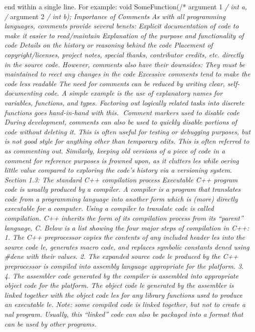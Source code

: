 end within a single line. For example: void SomeFunction(/* argument 1
\emph{/ int a, /} argument 2 \emph{/ int b); Importance of Comments As
with all programming languages, comments provide several benets:
Explicit documentation of code to make it easier to read/maintain
Explanation of the purpose and functionality of code Details on the
history or reasoning behind the code Placement of copyright/licenses,
project notes, special thanks, contributor credits, etc. directly in the
source code. However, comments also have their downsides: They must be
maintained to reect any changes in the code Excessive comments tend to
make the code less readable The need for comments can be reduced by
writing clear, self-documenting code. A simple example is the use of
explanatory names for variables, functions, and types. Factoring out
logically related tasks into discrete functions goes hand-in-hand with
this. Comment markers used to disable code During development, comments
can also be used to quickly disable portions of code without deleting
it. This is often useful for testing or debugging purposes, but is not
good style for anything other than temporary edits. This is often
referred to as commenting out. Similarly, keeping old versions of a
piece of code in a comment for reference purposes is frowned upon, as it
clutters les while oering little value compared to exploring the code's
history via a versioning system. Section 1.3: The standard C++
compilation process Executable C++ program code is usually produced by a
compiler. A compiler is a program that translates code from a
programming language into another form which is (more) directly
executable for a computer. Using a compiler to translate code is called
compilation. C++ inherits the form of its compilation process from its
``parent'' language, C. Below is a list showing the four major steps of
compilation in C++: 1. The C++ preprocessor copies the contents of any
included header les into the source code le, generates macro code, and
replaces symbolic constants dened using \#dene with their values. 2. The
expanded source code le produced by the C++ preprocessor is compiled
into assembly language appropriate for the platform. 3. 4. The assembler
code generated by the compiler is assembled into appropriate object code
for the platform. The object code le generated by the assembler is
linked together with the object code les for any library functions used
to produce an executable le. Note: some compiled code is linked
together, but not to create a nal program. Usually, this ``linked'' code
can also be packaged into a format that can be used by other programs.
}
